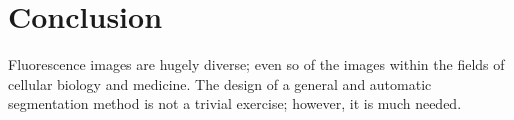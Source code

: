 \section{Conclusion}
\label{sec:cvgc_conclusion}

Fluorescence images are hugely diverse; even so of the images within the fields of cellular biology and medicine. The design of a general and  automatic segmentation method is not a trivial exercise; however, it is much needed.

